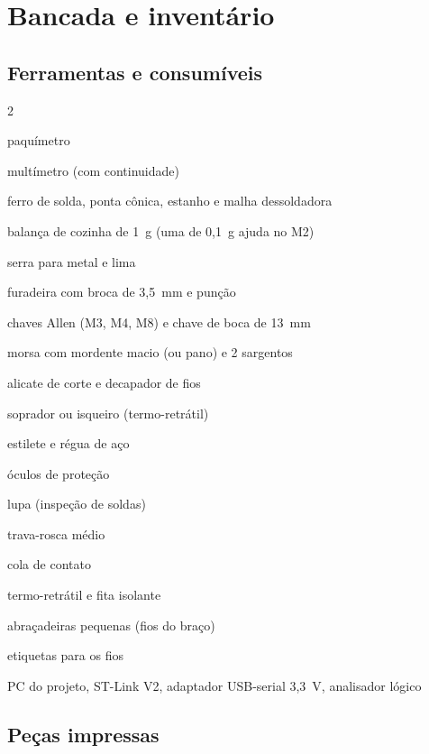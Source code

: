 \documentclass[11pt,a4paper]{article}
\begin{document}
\section{Bancada e inventário}
\label{sec:inventario}

\subsection{Ferramentas e consumíveis}

\begin{multicols}{2}
\begin{checklist}
  \item paquímetro
  \item multímetro (com continuidade)
  \item ferro de solda, ponta cônica, estanho e malha dessoldadora
  \item balança de cozinha de 1~g (uma de 0,1~g ajuda no M2)
  \item serra para metal e lima
  \item furadeira com broca de 3,5~mm e punção
  \item chaves Allen (M3, M4, M8) e chave de boca de 13~mm
  \item morsa com mordente macio (ou pano) e 2 sargentos
  \item alicate de corte e decapador de fios
  \item soprador ou isqueiro (termo-retrátil)
  \item estilete e régua de aço
  \item óculos de proteção
  \item lupa (inspeção de soldas)
  \item trava-rosca médio
  \item cola de contato
  \item termo-retrátil e fita isolante
  \item abraçadeiras pequenas (fios do braço)
  \item etiquetas para os fios
  \item PC do projeto, ST-Link V2, adaptador USB-serial 3,3~V, analisador lógico
\end{checklist}
\end{multicols}

\subsection{Peças impressas}
\end{document}
